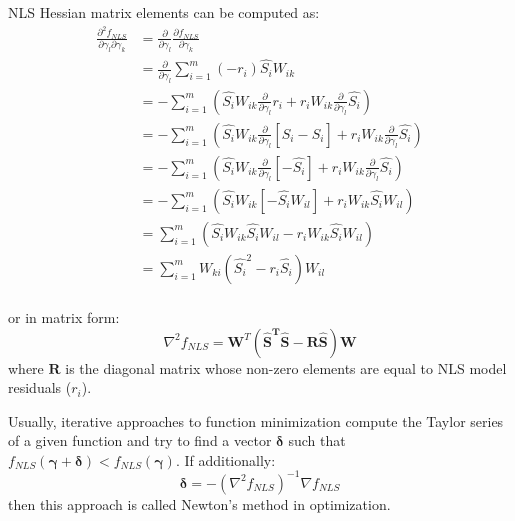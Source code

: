 NLS Hessian matrix elements can be computed as:
\begin{equation}
\begin{aligned}
\frac{\partial^2{f_{NLS}}}{\partial{\gamma_l}\partial{\gamma_k}} &= \frac{\partial}{\partial{\gamma_l}}\frac{\partial{f_{NLS}}}{\partial{\gamma_k}}\\
&=\frac{\partial}{\partial{\gamma_l}}\sum_{i=1}^{m}(-r_i)\hat{S_i}W_{ik}\\
&=-\sum_{i=1}^{m}\left(\hat{S_i}W_{ik}\frac{\partial}{\partial{\gamma_l}}r_i+r_iW_{ik}\frac{\partial}{\partial{\gamma_l}}\hat{S_i}\right)\\
&=-\sum_{i=1}^{m}\left(\hat{S_i}W_{ik}\frac{\partial}{\partial{\gamma_l}}\left[S_i-\hat{S_i}\right]+r_iW_{ik}\frac{\partial}{\partial{\gamma_l}}\hat{S_i}\right)\\
&=-\sum_{i=1}^{m}\left(\hat{S_i}W_{ik}\frac{\partial}{\partial{\gamma_l}}\left[-\hat{S_i}\right]+r_iW_{ik}\frac{\partial}{\partial{\gamma_l}}\hat{S_i}\right)\\
&=-\sum_{i=1}^{m}\left(\hat{S_i}W_{ik}\left[-\hat{S_i}W_{il}\right]+r_iW_{ik}\hat{S_i}W_{il}\right)\\
&=\sum_{i=1}^{m}\left(\hat{S_i}W_{ik}\hat{S_i}W_{il}-r_iW_{ik}\hat{S_i}W_{il}\right)\\
&=\sum_{i=1}^{m}W_{ki}\left(\hat{S_i}^2-r_i\hat{S_i}\right)W_{il}\\
\end{aligned}
\label{Eq:m6_eq_19}
\end{equation}

or in matrix form:
\begin{equation}
\nabla^2{f_{NLS}}=\boldsymbol{W}^T\left(\boldsymbol{\hat{S}^T\hat{S}-\boldsymbol{R\hat{S}}}\right)\boldsymbol{W}
\label{Eq:m6_eq_20}
\end{equation}
where $\boldsymbol{R}$ is the diagonal matrix whose non-zero elements are equal to NLS model residuals ($r_i$).\linebreak

Usually, iterative approaches to function minimization compute the Taylor series of a given function and try to find a vector $\boldsymbol{\delta}$ such that $f_{NLS}\left(\boldsymbol{\gamma}+\boldsymbol{\delta}\right)<f_{NLS}\left(\boldsymbol{\gamma}\right)$. If additionally:
\begin{equation}
\boldsymbol{\delta}=-\left(\nabla^2{f_{NLS}}\right)^{-1}\nabla{f_{NLS}}
\label{Eq:m6_eq_21}
\end{equation}
then this approach is called Newton's method in optimization.

